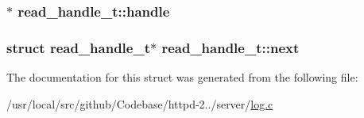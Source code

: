 \subsubsection[{\texorpdfstring{handle}{handle}}]{$\ast$ read\+\_\+handle\+\_\+t\+::handle}\hypertarget{structread__handle__t_a928abea4d2047efde124ccfb48ce6e26}{}\label{structread__handle__t_a928abea4d2047efde124ccfb48ce6e26}
\subsubsection[{\texorpdfstring{next}{next}}]{\setlength{\rightskip}{0pt plus 5cm}struct {\bf read\+\_\+handle\+\_\+t}$\ast$ read\+\_\+handle\+\_\+t\+::next}\hypertarget{structread__handle__t_ac0fe4fcdf848e8fd3ea10b1d567f8620}{}\label{structread__handle__t_ac0fe4fcdf848e8fd3ea10b1d567f8620}


The documentation for this struct was generated from the following file\+:\begin{DoxyCompactItemize}
\item 
/usr/local/src/github/\+Codebase/httpd-\/2../server/\hyperlink{log_8c}{log.\+c}\end{DoxyCompactItemize}
